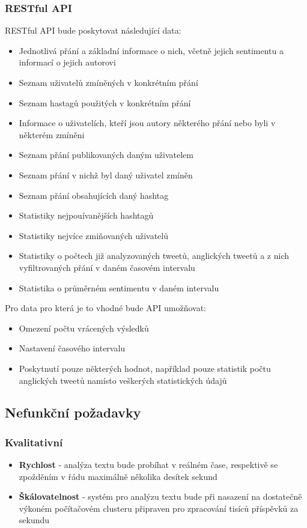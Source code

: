 \documentclass[thesis=B,czech]{FITthesis}[2012/06/26]
\begin{document}
\subsubsection{RESTful API}
RESTful API bude poskytovat následující data:

\begin{itemize}
\item Jednotlivá přání a základní informace o nich, včetně jejich sentimentu a informací o jejich autorovi
\item Seznam uživatelů zmíněných v konkrétním přání
\item Seznam hastagů použitých v konkrétním přání
\item Informace o uživatelích, kteří jsou autory některého přání nebo byli v některém zmíněni
\item Seznam přání publikovaných daným uživatelem
\item Seznam přání v nichž byl daný uživatel zmíněn
\item Seznam přání obsahujících daný hashtag
\item Statistiky nejpouívanějších hashtagů
\item Statistiky nejvíce zmiňovaných uživatelů
\item Statistiky o počtech již analyzovaných tweetů, anglických tweetů a z nich vyfiltrovaných přání v daném časovém intervalu
\item Statistika o průměrném sentimentu v daném intervalu
\end{itemize}

\noindent Pro data pro která je to vhodné bude API umožňovat:
\begin{itemize}
\item Omezení počtu vrácených výsledků
\item Nastavení časového intervalu
\item Poskytnutí pouze některých hodnot, například pouze statistik počtu anglických tweetů namísto veškerých statistických údajů
\end{itemize}

\subsection{Nefunkční požadavky}
\subsubsection{Kvalitativní}
\begin{itemize}
\item \textbf{Rychlost} - analýza textu bude probíhat v reálném čase, respektivě se zpožděním v řádu maximálně několika desítek sekund
\item \textbf{Škálovatelnost} - systém pro analýzu textu bude při nasazení na dostatečně výkoném počítačovém clusteru připraven pro zpracování tisíců příspěvků za sekundu
\end{itemize}
\end{document}
